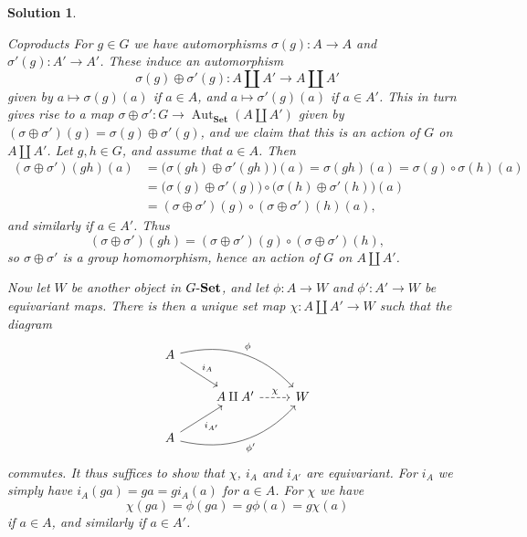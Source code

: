 \documentclass[article, a4paper, 11pt, oneside]{memoir}
\numberwithin{equation}{chapter}
\newcommand{\ncat}[1]{\mathbf{#1}} %
\newcommand{\catSet}{\ncat{Set}} %
\theoremstyle{nonumberplain}
\newtheorem{solution}{Solution}
\DeclareMathOperator{\Aut}{Aut}
\begin{document}
\begin{solution}
\begin{proofsec}
    \item[Coproducts]
    For $g \in G$ we have automorphisms $\sigma(g) \colon A \to A$ and $\sigma'(g) \colon A' \to A'$. These induce an automorphism
    \begin{equation*}
        \sigma(g) \oplus \sigma'(g) \colon
            A \coprod A' \to A \coprod A'
    \end{equation*}
    given by $a \mapsto \sigma(g)(a)$ if $a \in A$, and $a \mapsto \sigma'(g)(a)$ if $a \in A'$. This in turn gives rise to a map $\sigma \oplus \sigma' \colon G \to \Aut_\catSet(A \coprod A')$ given by $(\sigma \oplus \sigma')(g) = \sigma(g) \oplus \sigma'(g)$, and we claim that this is an action of $G$ on $A \coprod A'$. Let $g,h \in G$, and assume that $a \in A$. Then
    \begin{align*}
        (\sigma \oplus \sigma')(gh)(a)
            &= \bigl( \sigma(gh) \oplus \sigma'(gh) \bigr)(a)
             = \sigma(gh)(a)
             = \sigma(g) \circ \sigma(h) (a) \\
            &= \bigl( \sigma(g) \oplus \sigma'(g) \bigr) \circ \bigl( \sigma(h) \oplus \sigma'(h) \bigr) (a) \\
            &= (\sigma \oplus \sigma')(g) \circ (\sigma \oplus \sigma')(h) (a),
    \end{align*}
    and similarly if $a \in A'$. Thus
    \begin{equation*}
        (\sigma \oplus \sigma')(gh)
            = (\sigma \oplus \sigma')(g) \circ (\sigma \oplus \sigma')(h),
    \end{equation*}
    so $\sigma \oplus \sigma'$ is a group homomorphism, hence an action of $G$ on $A \coprod A'$.

    Now let $W$ be another object in $\catGSet$, and let $\phi \colon A \to W$ and $\phi' \colon A' \to W$ be equivariant maps. There is then a unique set map $\chi \colon A \coprod A' \to W$ such that the diagram
    \begin{equation*}
        \begin{tikzcd}
            A
                \ar[dr, "i_A"]
                \ar[drr, "\phi", bend left] \\
            & A \coprod A'
                \ar[r, "\chi", dashed]
            & W \\
            A
                \ar[ur, "i_{A'}", swap]
                \ar[urr, "\phi'", bend right, swap]
        \end{tikzcd}
    \end{equation*}
    commutes. It thus suffices to show that $\chi$, $i_A$ and $i_{A'}$ are equivariant. For $i_A$ we simply have $i_A(ga) = ga = g i_A(a)$ for $a \in A$. For $\chi$ we have
    \begin{equation*}
        \chi(ga)
            = \phi(ga)
            = g \phi(a)
            = g \chi(a)
    \end{equation*}
    if $a \in A$, and similarly if $a \in A'$.


\end{proofsec}
\end{solution}
\end{document}
